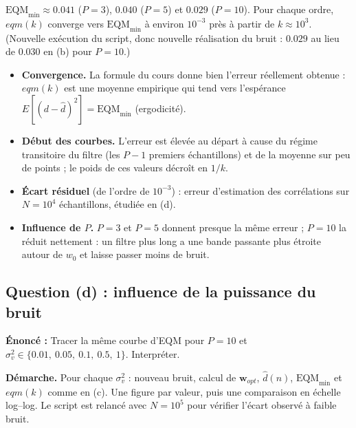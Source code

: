 \begin{resultat}
$\mathrm{EQM}_{\min}\approx 0.041$ ($P=3$), $0.040$ ($P=5$) et $0.029$ ($P=10$). Pour chaque ordre, $eqm(k)$ converge vers $\mathrm{EQM}_{\min}$ à environ $10^{-3}$ près à partir de $k\approx 10^3$.\\
{\small (Nouvelle exécution du script, donc nouvelle réalisation du bruit : $0.029$ au lieu de $0.030$ en (b) pour $P=10$.)}
\end{resultat}

\begin{interpretation}
\begin{itemize}
  \item \textbf{Convergence.} La formule du cours donne bien l'erreur réellement obtenue : $eqm(k)$ est une moyenne empirique qui tend vers l'espérance $E[(d-\hat d)^2]=\mathrm{EQM}_{\min}$ (ergodicité).
  \item \textbf{Début des courbes.} L'erreur est élevée au départ à cause du régime transitoire du filtre (les $P-1$ premiers échantillons) et de la moyenne sur peu de points ; le poids de ces valeurs décroît en $1/k$.
  \item \textbf{Écart résiduel} (de l'ordre de $10^{-3}$) : erreur d'estimation des corrélations sur $N=10^4$ échantillons, étudiée en (d).
  \item \textbf{Influence de $P$.} $P=3$ et $P=5$ donnent presque la même erreur ; $P=10$ la réduit nettement : un filtre plus long a une bande passante plus étroite autour de $w_0$ et laisse passer moins de bruit.
\end{itemize}
\end{interpretation}

\subsection{Question (d) : influence de la puissance du bruit}

\begin{enonce}
\textbf{Énoncé :} Tracer la même courbe d'EQM pour $P=10$ et $\sigma_v^2\in\{0.01,\ 0.05,\ 0.1,\ 0.5,\ 1\}$. Interpréter.
\end{enonce}

\textbf{Démarche.} Pour chaque $\sigma_v^2$ : nouveau bruit, calcul de $\mathbf{w}_{opt}$, $\hat d(n)$, $\mathrm{EQM}_{\min}$ et $eqm(k)$ comme en (c). Une figure par valeur, puis une comparaison en échelle log--log. Le script est relancé avec $N=10^5$ pour vérifier l'écart observé à faible bruit.

